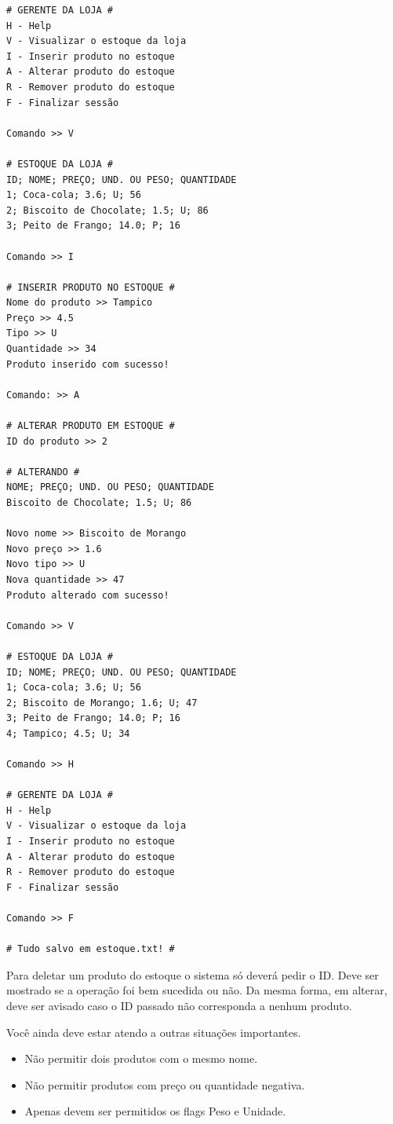 \documentclass[12pt]{article}
\begin{document}
\begin{verbatim}
# GERENTE DA LOJA #
H - Help
V - Visualizar o estoque da loja
I - Inserir produto no estoque
A - Alterar produto do estoque
R - Remover produto do estoque
F - Finalizar sessão

Comando >> V

# ESTOQUE DA LOJA #
ID; NOME; PREÇO; UND. OU PESO; QUANTIDADE
1; Coca-cola; 3.6; U; 56
2; Biscoito de Chocolate; 1.5; U; 86
3; Peito de Frango; 14.0; P; 16

Comando >> I

# INSERIR PRODUTO NO ESTOQUE #
Nome do produto >> Tampico
Preço >> 4.5
Tipo >> U
Quantidade >> 34
Produto inserido com sucesso!

Comando: >> A

# ALTERAR PRODUTO EM ESTOQUE #
ID do produto >> 2

# ALTERANDO #
NOME; PREÇO; UND. OU PESO; QUANTIDADE
Biscoito de Chocolate; 1.5; U; 86

Novo nome >> Biscoito de Morango
Novo preço >> 1.6
Novo tipo >> U
Nova quantidade >> 47
Produto alterado com sucesso!

Comando >> V

# ESTOQUE DA LOJA #
ID; NOME; PREÇO; UND. OU PESO; QUANTIDADE
1; Coca-cola; 3.6; U; 56
2; Biscoito de Morango; 1.6; U; 47
3; Peito de Frango; 14.0; P; 16
4; Tampico; 4.5; U; 34

Comando >> H

# GERENTE DA LOJA #
H - Help
V - Visualizar o estoque da loja
I - Inserir produto no estoque
A - Alterar produto do estoque
R - Remover produto do estoque
F - Finalizar sessão

Comando >> F

# Tudo salvo em estoque.txt! #
\end{verbatim}

Para deletar um produto do estoque o sistema só deverá pedir o ID. Deve ser mostrado se a operação foi bem sucedida ou não. Da mesma forma, em alterar, deve ser avisado caso o ID passado não corresponda a nenhum produto.

Você ainda deve estar atendo a outras situações importantes.

\begin{itemize}
\item Não permitir dois produtos com o mesmo nome.
\item Não permitir produtos com preço ou quantidade negativa.
\item Apenas devem ser permitidos os flags Peso e Unidade.
\end{itemize}
\end{document}
